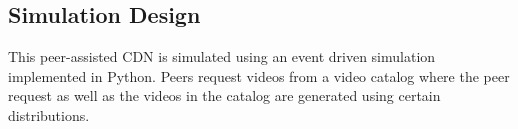 \documentclass[10pt,final,journal,a4paper]{IEEEtran}
\begin{document}




\subsection{Simulation Design}\label{simulationdesign}

This peer-assisted CDN is simulated using an event driven simulation implemented in Python. 
Peers request videos from a video catalog where the peer request as well as the videos in the catalog are generated using certain distributions.

\end{document}
